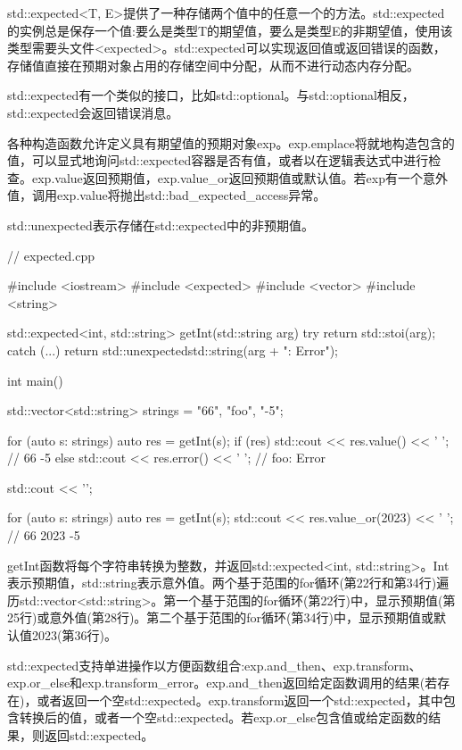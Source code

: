 std::expected<T, E>提供了一种存储两个值中的任意一个的方法。std::expected的实例总是保存一个值:要么是类型T的期望值，要么是类型E的非期望值，使用该类型需要头文件<expected>。std::expected可以实现返回值或返回错误的函数，存储值直接在预期对象占用的存储空间中分配，从而不进行动态内存分配。

std::expected有一个类似的接口，比如std::optional。与std::optional相反，std::expected会返回错误消息。

各种构造函数允许定义具有期望值的预期对象exp。exp.emplace将就地构造包含的值，可以显式地询问std::expected容器是否有值，或者以在逻辑表达式中进行检查。exp.value返回预期值，exp.value\_or返回预期值或默认值。若exp有一个意外值，调用exp.value将抛出std::bad\_expected\_access异常。

std::unexpected表示存储在std::expected中的非预期值。


\begin{cpp}
// expected.cpp

#include <iostream>
#include <expected>
#include <vector>
#include <string>

std::expected<int, std::string> getInt(std::string arg) {
	try {
		return std::stoi(arg);
	}
	catch (...) {
		return std::unexpected{std::string(arg + ": Error")};
	}
}

int main() {

	std::vector<std::string> strings = {"66", "foo", "-5"};
	
	for (auto s: strings) {
		auto res = getInt(s);
		if (res) {
			std::cout << res.value() << ' '; // 66 -5
		}
		else {
			std::cout << res.error() << ' '; // foo: Error
		}
	}
	
	std::cout << '\n';
	
	for (auto s: strings) {
		auto res = getInt(s);
		std::cout << res.value_or(2023) << ' '; // 66 2023 -5
	}

}
\end{cpp}

getInt函数将每个字符串转换为整数，并返回std::expected<int, std::string>。Int表示预期值，std::string表示意外值。两个基于范围的for循环(第22行和第34行)遍历std::vector<std::string>。第一个基于范围的for循环(第22行)中，显示预期值(第25行)或意外值(第28行)。第二个基于范围的for循环(第34行)中，显示预期值或默认值2023(第36行)。

std::expected支持单进操作以方便函数组合:exp.and\_then、exp.transform、exp.or\_else和exp.transform\_error。exp.and\_then返回给定函数调用的结果(若存在)，或者返回一个空std::expected。exp.transform返回一个std::expected，其中包含转换后的值，或者一个空std::expected。若exp.or\_else包含值或给定函数的结果，则返回std::expected。

